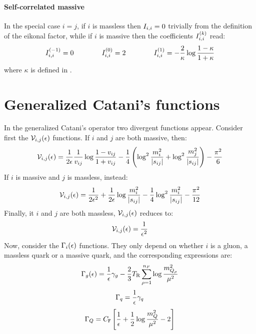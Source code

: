 \paragraph{Self-correlated massive}

In the special case $ i = j $, if $ i $ is massless then $ I_{i,i} = 0 $ trivially from the definition of the eikonal factor, while if $ i $ is massive then the coefficients $ I_{i,i}^{(k)} $ read:
\begin{equation}
  I_{i,i}^{(-1)} = 0
  \qquad \qquad
  I_{i,i}^{(0)} = 2
  \qquad \qquad
  I_{i,i}^{(1)} = - \frac{2}{\kappa} \log \frac{1 - \kappa}{1 + \kappa}
\end{equation}
where $ \kappa $ is defined in .

\section{Generalized Catani's functions}
\label{sec:cat-fun}

In the generalized Catani's operator  two divergent functions appear. Consider first the $ \mathcal{V}_{i,j}(\epsilon) $ functions. If $ i $ and $ j $ are both massive, then:
\begin{equation}
  \mathcal{V}_{i,j}(\epsilon) = \frac{1}{2\epsilon} \frac{1}{v_{ij}} \log \frac{1 - v_{ij}}{1 + v_{ij}} - \frac{1}{4} \left( \log^2 \frac{m_i^2}{\left\lvert s_{ij}\right\rvert} + \log^2 \frac{m_j^2}{\left\lvert s_{ij}\right\rvert} \right) - \frac{\pi^2}{6}
\end{equation}
If $ i $ is massive and $ j $ is massless, instead:
\begin{equation}
  \mathcal{V}_{i,j}(\epsilon) = \frac{1}{2\epsilon^2} + \frac{1}{2\epsilon} \log \frac{m_i^2}{\left\lvert s_{ij}\right\rvert} - \frac{1}{4} \log^2 \frac{m_i^2}{\left\lvert s_{ij}\right\rvert} - \frac{\pi^2}{12}
\end{equation}
Finally, it $ i $ and $ j $ are both massless, $ \mathcal{V}_{i,j}(\epsilon) $ reduces to:
\begin{equation}
  \mathcal{V}_{i,j}(\epsilon) = \frac{1}{\epsilon^2}
\end{equation}
Now, consider the $ \Gamma_i(\epsilon) $ functions. They only depend on whether $ i $ is a gluon, a massless quark or a massive quark, and the corresponding expressions are:
\begin{equation}
  \Gamma_g(\epsilon) = \frac{1}{\epsilon} \gamma_g - \frac{2}{3} T_\text{R} \sum_{\rho = 1}^{n_F} \log \frac{m_{Q_\rho}^2}{\mu^2}
\end{equation}
\begin{equation}
  \Gamma_q = \frac{1}{\epsilon} \gamma_q
\end{equation}
\begin{equation}
  \Gamma_Q = C_\mathtt{F} \left[ \frac{1}{\epsilon} + \frac{1}{2} \log \frac{m_Q^2}{\mu^2} - 2 \right]
\end{equation}











